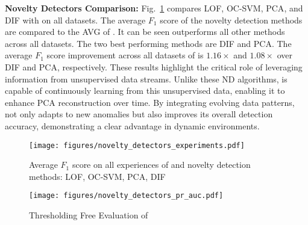 
\textbf{Novelty Detectors Comparison:} Fig.~\ref{fig:novelty_methods_results} compares LOF\cite{Faber_2024}, OC-SVM\cite{Faber_2024}, PCA\cite{rios2022incdfm}, and DIF \cite{xu2023deep} with \Design{} on all datasets. The average $F_{1}$ score of the novelty detection methods are compared to the AVG of \Design{}.  It can be seen \Design{} outperforms all other methods across all datasets. The two best performing methods are DIF and PCA. The average $F_{1}$ score improvement across all datasets of \Design{} is $1.16\times$ and $1.08\times$ over DIF and PCA, respectively. These results highlight the critical role of leveraging information from unsupervised data streams. Unlike these ND algorithms, \Design{} is capable of continuously learning from this unsupervised data, enabling it to enhance PCA reconstruction over time. By integrating evolving data patterns, \Design{} not only adapts to new anomalies but also improves its overall detection accuracy, demonstrating a clear advantage in dynamic environments.


\begin{figure}
    \centering
    \texttt{[image: figures/novelty\_detectors\_experiments.pdf]}
    \caption{Average $F_1$ score on all experiences of \Design{} and novelty detection methods: LOF, OC-SVM, PCA, DIF}
    \label{fig:novelty_methods_results}
\end{figure}
\begin{figure}
    \centering
    \texttt{[image: figures/novelty\_detectors\_pr\_auc.pdf]}
    \caption{Thresholding Free Evaluation of \Design{}}
    \label{fig:thresholding_free}
\end{figure}

